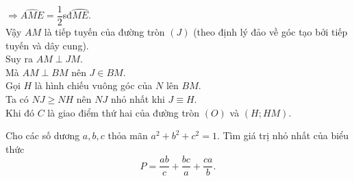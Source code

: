 \begin{ex}
{\begin{enumerate}
		$\Rightarrow \widehat{AME}=\dfrac{1}{2}$sđ$\wideparen{ME}$.\\
		Vậy $AM$ là tiếp tuyến của đường tròn $(J)$ (theo định lý đảo về góc tạo bởi tiếp tuyến và dây cung).\\
		Suy ra $AM\perp JM$.\\
		Mà $AM\perp BM$ nên $J\in BM$.\\
		Gọi $H$ là hình chiếu vuông góc của $N$ lên $BM$.\\
		Ta có $NJ\ge NH$ nên $NJ$ nhỏ nhất khi $J\equiv H$.\\
		Khi đó $C$ là giao điểm thứ hai của đường tròn $(O)$ và $(H;HM)$.
	\end{enumerate}
	}
\end{ex}
\begin{ex}%
	Cho các số dương $a,b,c$ thỏa mãn $a^2+b^2+c^2=1$. Tìm giá trị nhỏ nhất của biểu thức $$P=\dfrac{ab}{c}+\dfrac{bc}{a}+\dfrac{ca}{b}.$$
\end{ex}
